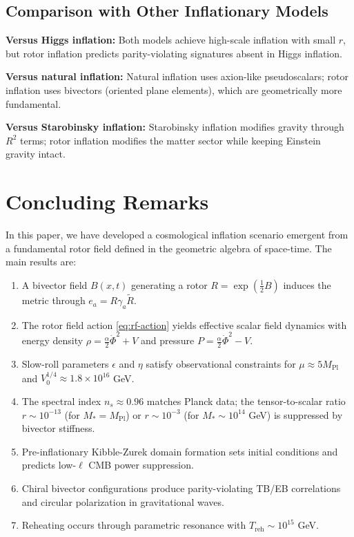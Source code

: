 \documentclass[11pt,a4paper]{article}
\numberwithin{equation}{section}
\theoremstyle{plain}
\theoremstyle{definition}
\theoremstyle{remark}
\begin{document}
\subsection{Comparison with Other Inflationary Models}

\textbf{Versus Higgs inflation:} Both models achieve high-scale inflation with small $r$, but rotor inflation predicts parity-violating signatures absent in Higgs inflation.

\textbf{Versus natural inflation:} Natural inflation uses axion-like pseudoscalars; rotor inflation uses bivectors (oriented plane elements), which are geometrically more fundamental.

\textbf{Versus Starobinsky inflation:} Starobinsky inflation modifies gravity through $R^2$ terms; rotor inflation modifies the matter sector while keeping Einstein gravity intact.

\section{Concluding Remarks}
\label{sec:conclusion}

In this paper, we have developed a cosmological inflation scenario emergent from a fundamental rotor field defined in the geometric algebra of space-time. The main results are:

\begin{enumerate}
  \item A bivector field $B(x,t)$ generating a rotor $R = \exp(\frac{1}{2}B)$ induces the metric through $e_a = R\gamma_a\widetilde{R}$.
  \item The rotor field action \eqref{eq:rf-action} yields effective scalar field dynamics with energy density $\rho = \frac{\alpha}{2}\dot{\Phi}^2 + V$ and pressure $P = \frac{\alpha}{2}\dot{\Phi}^2 - V$.
  \item Slow-roll parameters $\epsilon$ and $\eta$ satisfy observational constraints for $\mu \approx 5M_{\mathrm{Pl}}$ and $V_0^{1/4} \approx 1.8 \times 10^{16}$ GeV.
  \item The spectral index $n_s \approx 0.96$ matches Planck data; the tensor-to-scalar ratio $r \sim 10^{-13}$ (for $M_* = M_{\mathrm{Pl}}$) or $r \sim 10^{-3}$ (for $M_* \sim 10^{14}$ GeV) is suppressed by bivector stiffness.
  \item Pre-inflationary Kibble-Zurek domain formation sets initial conditions and predicts low-$\ell$ CMB power suppression.
  \item Chiral bivector configurations produce parity-violating TB/EB correlations and circular polarization in gravitational waves.
  \item Reheating occurs through parametric resonance with $T_{\mathrm{reh}} \sim 10^{15}$ GeV.
\end{enumerate}
\end{document}
